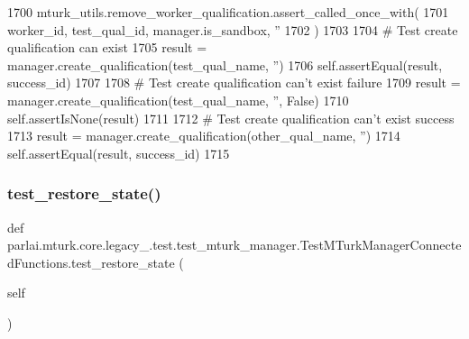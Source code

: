 \begin{DoxyCode}
1700         mturk\_utils.remove\_worker\_qualification.assert\_called\_once\_with(
1701             worker\_id, test\_qual\_id, manager.is\_sandbox, \textcolor{stringliteral}{''}
1702         )
1703 
1704         \textcolor{comment}{# Test create qualification can exist}
1705         result = manager.create\_qualification(test\_qual\_name, \textcolor{stringliteral}{''})
1706         self.assertEqual(result, success\_id)
1707 
1708         \textcolor{comment}{# Test create qualification can't exist failure}
1709         result = manager.create\_qualification(test\_qual\_name, \textcolor{stringliteral}{''}, \textcolor{keyword}{False})
1710         self.assertIsNone(result)
1711 
1712         \textcolor{comment}{# Test create qualification can't exist success}
1713         result = manager.create\_qualification(other\_qual\_name, \textcolor{stringliteral}{''})
1714         self.assertEqual(result, success\_id)
1715 
\end{DoxyCode}
\mbox{\label{classparlai_1_1mturk_1_1core_1_1legacy__2018_1_1test_1_1test__mturk__manager_1_1TestMTurkManagerConnectedFunctions_a7966fef8eeb04818945b5f39a81f1f3c}} 
\subsubsection{\texorpdfstring{test\+\_\+restore\+\_\+state()}{test\_restore\_state()}}
{\footnotesize\ttfamily def parlai.\+mturk.\+core.\+legacy\+\_.\+test.\+test\+\_\+mturk\+\_\+manager.\+Test\+M\+Turk\+Manager\+Connected\+Functions.\+test\+\_\+restore\+\_\+state (\begin{DoxyParamCaption}\item[{}]{self }\end{DoxyParamCaption})}



